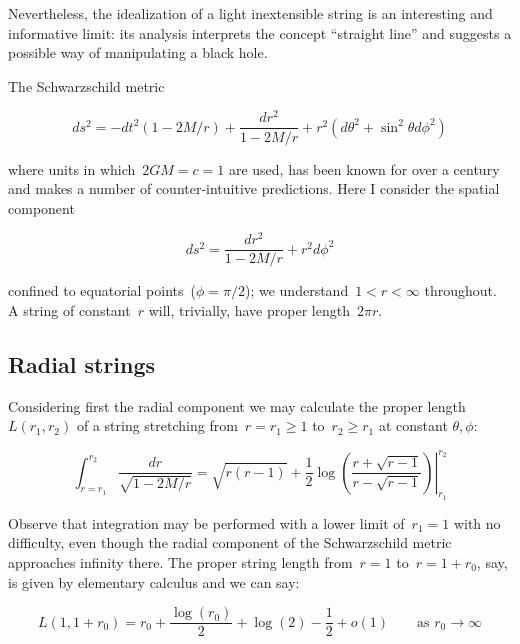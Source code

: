 \documentclass[prb,preprint]{revtex4-1}
\begin{document}
Nevertheless, the idealization of a light inextensible string is an
interesting and informative limit: its analysis interprets the concept
``straight line'' and suggests a possible way of manipulating a black
hole.  

The Schwarzschild metric

\begin{equation}\label{schwarzschild}
ds^2= -dt^2\left(1-2M/r\right) +\frac{dr^2}{1-2M/r} + r^2\left(d\theta^2 + \sin^2\theta d\phi^2\right)
\end{equation}

where units in which~$2GM=c=1$ are used, has been known for over a
century and makes a number of counter-intuitive predictions.  Here I
consider the spatial component

\begin{equation}\label{spatial_schwarzschild}
  ds^2= \frac{dr^2}{1-2M/r} + r^2d\phi^2
\end{equation}

confined to equatorial points~($\phi=\pi/2$); we
understand~$1<r<\infty$ throughout.  A string of constant~$r$ will,
trivially, have proper length~$2\pi r$.

\subsection*{Radial strings}

Considering first the radial component we may calculate the
proper length $L\left(r_1,r_2\right)$ of a string stretching
from~$r=r_1\geq 1$ to~$r_2\geq r_1$ at constant $\theta,\phi$:

\begin{equation}\label{radial_string_length}
  \int_{r=r_1}^{r_2}\frac{dr}{\sqrt{1-2M/r}}=
  \left.
  \sqrt{r(r-1)} +\frac{1}{2}\log\left(
  \frac{r+\sqrt{r-1}}{r-\sqrt{r-1}}\right)
  \right|_{r_1}^{r_2}
  \end{equation}

Observe that integration may be performed with a lower limit
of~$r_1=1$ with no difficulty, even though the radial component of the
Schwarzschild metric approaches infinity there.  The proper string
length from~$r=1$ to~$r=1+r_0$, say, is given by elementary calculus
and we can say:

\begin{equation}\label{proper_string_length_large_r}
  L\left(1,1+r_0\right)=
  r_0 + \frac{\log(r_0)}{2}
  + \log(2) -\frac{1}{2} 
  +o(1)\qquad\mbox{as $r_0\longrightarrow\infty$}
\end{equation}
\end{document}
